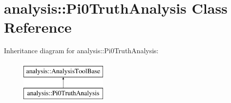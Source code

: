 \hypertarget{classanalysis_1_1Pi0TruthAnalysis}{\section{analysis\-:\-:Pi0\-Truth\-Analysis Class Reference}
\label{classanalysis_1_1Pi0TruthAnalysis}
}
Inheritance diagram for analysis\-:\-:Pi0\-Truth\-Analysis\-:\begin{figure}[H]
\begin{center}
\leavevmode
\includegraphics[height=2.000000cm]{classanalysis_1_1Pi0TruthAnalysis}
\end{center}
\end{figure}
